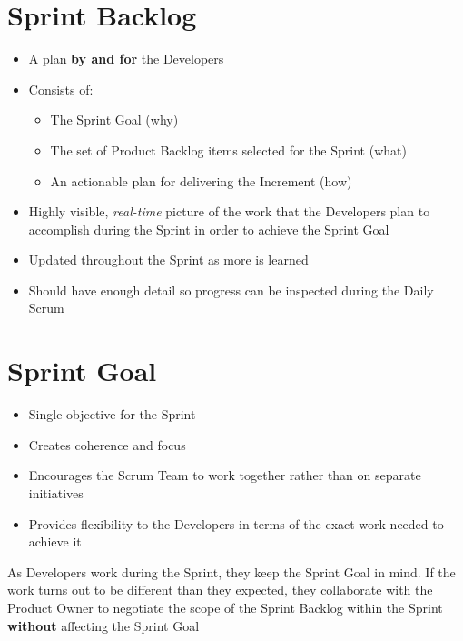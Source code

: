 \documentclass[a4paper,11pt,twocolumn]{article}
\begin{document}
\section*{Sprint Backlog}
\begin{itemize}
	\item A plan \textbf{by and for} the Developers
	\item Consists of:
	\begin{itemize}
	\item The Sprint Goal (why)
	\item The set of Product Backlog items selected for the Sprint (what)
	\item An actionable plan for delivering the Increment (how)
	\end{itemize}
	\item Highly visible, \textit{real-time} picture of the work that the Developers plan to accomplish during the Sprint in order to achieve the Sprint Goal
	\item Updated throughout the Sprint as more is learned
	\item Should have enough detail so progress can be inspected during the Daily Scrum
\end{itemize}


\section*{Sprint Goal}
\begin{itemize}
	\item Single objective for the Sprint
	\item Creates coherence and focus
	\item Encourages the Scrum Team to work together rather than on separate initiatives
	\item Provides flexibility to the Developers in terms of the exact work needed to achieve it
\end{itemize}

\begin{tcolorbox}[colback=black!8!white,colframe=gray!50!black,title=Note,sharp corners,fonttitle=\normalsize\bfseries,fontupper=\normalsize,left=0.7em,right=0.7em]
	As Developers work during the Sprint, they keep the Sprint Goal in mind. If the work turns out to be different than they expected, they collaborate with the Product Owner to negotiate the scope of the Sprint Backlog within the Sprint \textbf{without} affecting the Sprint Goal
\end{tcolorbox}
\end{document}
